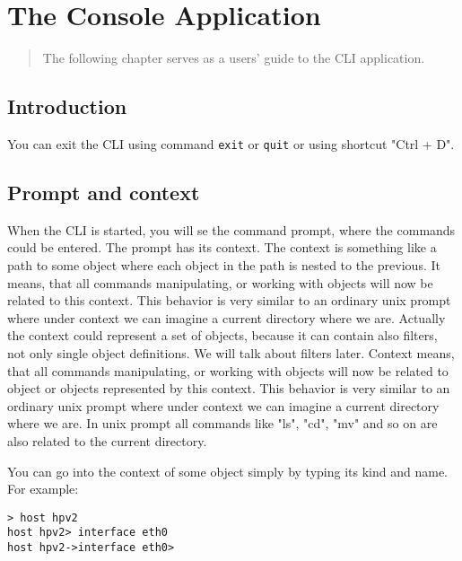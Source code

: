 \documentclass[deska]{subfiles}
\begin{document}
\chapter{The Console Application}
\label{sec:usage-cli}

\begin{abstract}
The following chapter serves as a users' guide to the CLI application.
\end{abstract}


\section{Introduction}

You can exit the CLI using command {\tt exit} or {\tt quit} or using shortcut "Ctrl + D".

\section{Prompt and context}

When the CLI is started, you will se the command prompt, where the commands could be entered. The prompt has its context.
The context is something like a path to some object where each object in the path is nested to the previous. 
It means, that all commands manipulating, or working with objects will now be related to this context. This behavior
is very similar to an ordinary unix prompt where under context we can imagine a current directory where we are. Actually the
context could represent a set of objects, because it can contain also filters, not only single object definitions.
We will talk about filters later. Context means, that all commands manipulating, or working with objects will now be related to
object or objects represented by this context. This behavior is very similar to an ordinary unix prompt where under context
we can imagine a current directory where we are. In unix prompt all commands like "ls", "cd", "mv" and so on are also related
to the current directory.

You can go into the context of some object simply by typing its kind and name. For example:

\begin{verbatim}
> host hpv2
host hpv2> interface eth0
host hpv2->interface eth0>
\end{verbatim}
\end{document}
